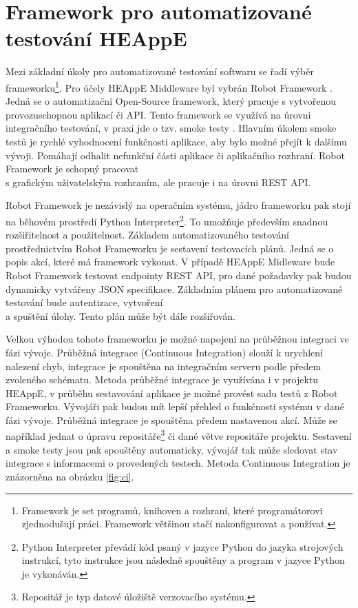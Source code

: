 \section{Framework pro automatizované testování HEAppE}
Mezi základní úkoly pro automatizované testování softwaru se řadí výběr frameworku\footnote{Framework je set programů, knihoven a rozhraní, které programátorovi zjednodušují práci. Framework většinou stačí nakonfigurovat a používat.}. Pro účely HEAppE Middleware byl vybrán Robot Framework \cite{UDdvJfGpGdOGQs2a}. Jedná se o automatizační Open-Source framework, který pracuje s vytvořenou provozuschopnou aplikací či API. Tento framework se využívá na úrovni integračního testování, v praxi jde o tzv. smoke testy \cite{K35ZsSqAfq3Ec1XJ}. Hlavním úkolem smoke testů je rychlé vyhodnocení funkčnosti aplikace, aby bylo možné přejít k dalšímu vývoji. Pomáhají odhalit nefunkční části aplikace či aplikačního rozhraní. Robot Framework je schopný pracovat \\s grafickým uživatelským rozhraním, ale pracuje i na úrovni REST API.

Robot Framework je nezávislý na operačním systému, jádro frameworku pak stojí na běhovém prostředí Python Interpreter\footnote{Python Interpreter převádí kód psaný v jazyce Python do jazyka strojových instrukcí, tyto instrukce jsou následně spouštěny a program v jazyce Python je vykonáván.}. To umožňuje především snadnou rozšiřitelnost a použitelnost. Základem automatizovaného testování prostřednictvím Robot Frameworku je sestavení testovacích plánů. Jedná se o popis akcí, které má framework vykonat. V případě HEAppE Midleware bude Robot Framework testovat endpointy REST API, pro dané požadavky pak budou dynamicky vytvářeny JSON specifikace. Základním plánem pro automatizované testování bude autentizace, vytvoření \\a spuštění úlohy. Tento plán může být dále rozšiřován.

Velkou výhodou tohoto frameworku je možné napojení na průběžnou integraci ve fázi vývoje. Průběžná integrace (Continuous Integration) slouží k urychlení nalezení chyb, integrace je spouštěna na integračním serveru podle předem zvoleného schématu. Metoda průběžné integrace je využívána i v projektu HEAppE, v průběhu sestavování aplikace je možné provést sadu testů z Robot Frameworku. Vývojáři pak budou mít lepší přehled o funkčnosti systému v dané fázi vývoje. Průběžná integrace je spouštěna předem nastavenou akcí. Může se například jednat o úpravu repositáře\footnote{Repositář je typ datové úložiště verzovacího systému.} či dané větve repositáře projektu. Sestavení a smoke testy jsou pak spouštěny automaticky, vývojář tak může sledovat stav integrace s informacemi o provedených testech. Metoda Continuous Integration je znázorněna na obrázku \ref{fig:ci}.

